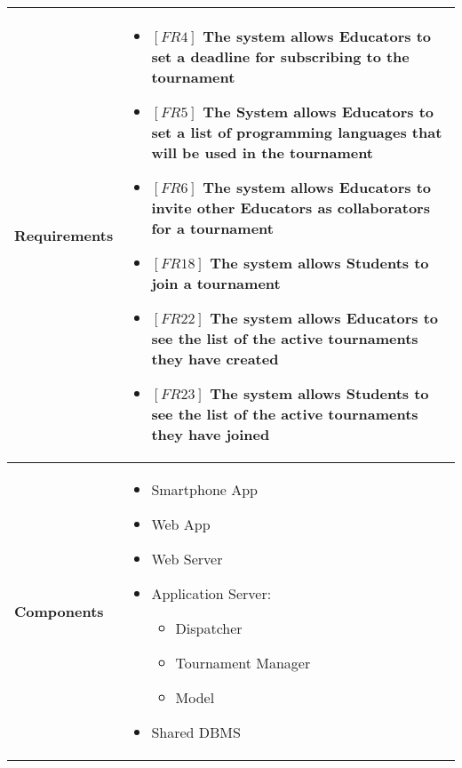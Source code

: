 \documentclass{article}
\begin{document}
\begin{table}[H]
 \renewcommand{\arraystretch}{1.5}
    \centering
    \begin{tabular}{|l|p{10cm}|}
        \hline
        \textbf{Requirements} & 
        \vspace{-0.6cm}
        \begin{itemize}[label={}, left=0pt, align=left, itemsep=5pt]
            \item $[FR4]$ The system allows Educators to set a deadline for subscribing to the tournament
            \item $[FR5]$ The System allows Educators to set a list of programming languages that will be used in the tournament
            \item $[FR6]$ The system allows Educators to invite other Educators as collaborators for a tournament
            \item $[FR18]$ The system allows Students to join a tournament
            \item $[FR22]$ The system allows Educators to see the list of the active tournaments they have created
            \item $[FR23]$ The system allows Students to see the list of the active tournaments they have joined
        \end{itemize} \\
        \hline
        \textbf{Components} & 
        \begin{itemize}[align=left, topsep=0pt, partopsep=0pt]
            \item Smartphone App
            \item Web App
            \item Web Server
            \item Application Server:
            \begin{itemize}
                \item Dispatcher
                \item Tournament Manager
                \item Model
            \end{itemize}
            \item Shared DBMS 
        \end{itemize} \\
        \hline
    \end{tabular}
\end{table}
\end{document}
